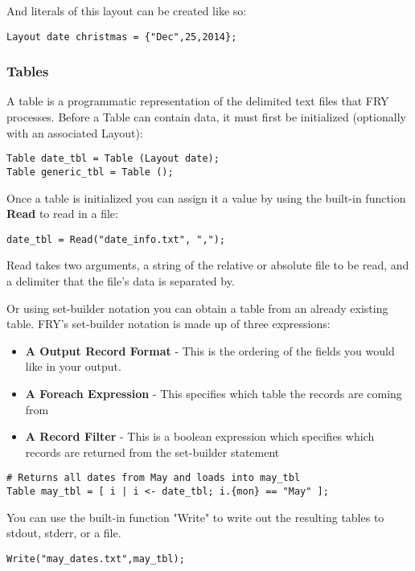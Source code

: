\documentclass{article}
\begin{document}
And literals of this layout can be created like so:
\begin{lstlisting}
Layout date christmas = {"Dec",25,2014};
\end{lstlisting}

\subsubsection{Tables}
\label{sec:Tables}
A table is a programmatic representation of the delimited text files that FRY processes. Before a Table can contain data, it must first be initialized (optionally with an associated Layout):

\begin{lstlisting}
Table date_tbl = Table (Layout date);
Table generic_tbl = Table ();
\end{lstlisting}

Once a table is initialized you can assign it a value by using the built-in function \textbf{Read} to read in a file:

\begin{lstlisting}
date_tbl = Read("date_info.txt", ",");
\end{lstlisting}

Read takes two arguments, a string of the relative or absolute file to be read, and a delimiter that the file's data is separated by.

Or using set-builder notation you can obtain a table from an already existing table. FRY's set-builder notation is made up of three expressions:
\begin{itemize}
\item \textbf{A Output Record Format} - This is the ordering of the fields you would like in your output.
\item \textbf{A Foreach Expression} - This specifies which table the records are coming from
\item \textbf{A Record Filter} - This is a boolean expression which specifies which records are returned from the set-builder statement
\end{itemize}

\begin{lstlisting}
# Returns all dates from May and loads into may_tbl
Table may_tbl = [ i | i <- date_tbl; i.{mon} == "May" ];
\end{lstlisting}
You can use the built-in function "Write" to write out the resulting tables to stdout, stderr, or a file.
\begin{lstlisting}
Write("may_dates.txt",may_tbl);
\end{lstlisting}
\end{document}
